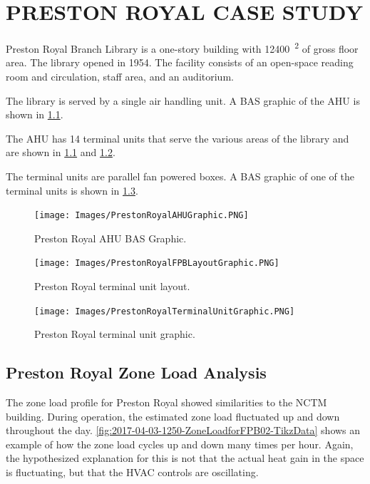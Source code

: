 \chapter{\texorpdfstring{\MakeUppercase{Preston Royal Case Study}}{Preston Royal Case Study}}

Preston Royal Branch Library is a one-story building with
\SI{12400}{\feet\squared} of gross floor area. The library opened in 1954. The
facility consists of an open-space reading room and circulation, staff area,
and an auditorium.

The library is served by a single air handling unit. A BAS graphic of
the AHU is shown in \figref{} \ref{fig:PrestonRoyalAHUGraphic}. 

The AHU has 14 terminal units that serve the various areas of the
library and are shown in \figref{} \ref{fig:PrestonRoyalAHUGraphic} and
\ref{fig:PrestonRoyalTerminalUnitLayout}.

The terminal units are parallel fan powered boxes. A BAS graphic of one
of the terminal units is shown in \figref{}
\ref{fig:PrestonRoyalTerminalUnitGraphic}.

\begin{figure}
\centering
\texttt{[image: Images/PrestonRoyalAHUGraphic.PNG]}
\caption{Preston Royal AHU BAS Graphic.}
\label{fig:PrestonRoyalAHUGraphic}
\end{figure}

\begin{figure}
\centering
\texttt{[image: Images/PrestonRoyalFPBLayoutGraphic.PNG]}
\caption{Preston Royal terminal unit layout.}
\label{fig:PrestonRoyalTerminalUnitLayout}
\end{figure}

\begin{figure}
\centering
\texttt{[image: Images/PrestonRoyalTerminalUnitGraphic.PNG]}
\caption{Preston Royal terminal unit graphic. }
\label{fig:PrestonRoyalTerminalUnitGraphic}
\end{figure}



\section{Preston Royal Zone Load Analysis}

The zone load profile for Preston Royal showed similarities to the NCTM
building. During operation, the estimated zone load fluctuated up and
down throughout the day. \figref{}
\ref{fig:2017-04-03-1250-ZoneLoadforFPB02-TikzData} shows an example of
how the zone load cycles up and down many times per hour. Again, the
hypothesized explanation for this is not that the actual heat gain in
the space is fluctuating, but that the HVAC controls are oscillating. 

